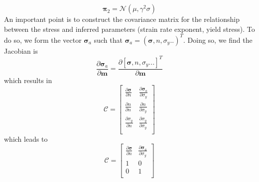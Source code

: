 \documentclass[12pt]{article}
\newcommand{\mm}{{\ensuremath{\boldsymbol{m}}}}
\newcommand{\ppi}{{\ensuremath{\boldsymbol{\pi}}}}
\newcommand{\ssigma}{{\ensuremath{\boldsymbol{\sigma}}}}
\begin{document}
\begin{equation}
\ppi_2 = \mathcal N(\mu,\gamma^2\sigma)
\end{equation}
An important point is to construct the covariance matrix for the relationship between the stress and inferred parameters (strain rate exponent, yield stress). To do so, we form the vector $\ssigma_{a}$ such that  $\ssigma_a = (\ssigma, n,\sigma_y..)^T$. Doing so, we find the Jacobian is
\begin{equation}
\frac{\partial \ssigma_a}{\partial \mm} = \frac{\partial [\ssigma, n, \sigma_y...]^T}{\partial \mm}
\end{equation}
which results in 
\begin{equation}
\mathcal C = 
\begin{bmatrix}
\frac{\partial \ssigma}{\partial n} & \frac{\partial \ssigma_{a}}{\partial \sigma_y} \\
\frac{\partial n}{\partial n}& \frac{\partial n}{\partial \sigma_y} \\
\frac{\partial \sigma_y}{\partial n}& \frac{\partial \sigma_y}{\partial \sigma_y} \\
\end{bmatrix}
\end{equation}
which leads to 
\begin{equation}
\mathcal C = 
\begin{bmatrix}
\frac{\partial \ssigma}{\partial n} & \frac{\partial \ssigma_{a}}{\partial \sigma_y} \\
1 & 0\\
0 & 1 \\
\end{bmatrix}
\end{equation}

\begin{figure}[H]
\centering
\hspace{-1.2cm}
\end{figure}
\end{document}
